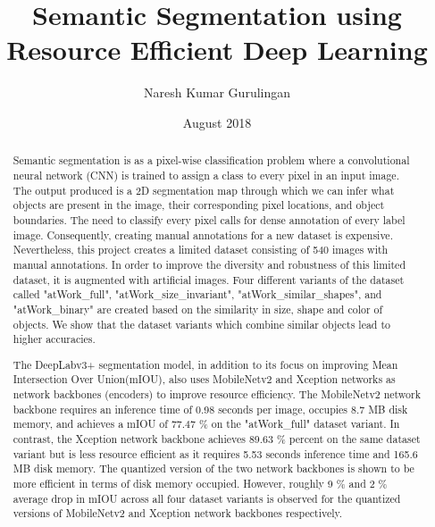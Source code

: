 \documentclass[rnd]{mas_report}
\author{Naresh Kumar Gurulingan}
\title{Semantic Segmentation using Resource Efficient Deep Learning}
\date{August 2018}
\begin{document}
\begin{titlepage}
    \maketitle
\end{titlepage}


\pagestyle{plain}


\cleardoublepage
\statementpage

\begin{abstract}
Semantic segmentation is as a pixel-wise classification problem where a convolutional neural network (CNN) is trained to assign a class to every pixel in an input image. The output produced is a 2D segmentation map through which we can infer what objects are present in the image, their corresponding pixel locations, and object boundaries. The need to classify every pixel calls for dense annotation of every label image. Consequently, creating manual annotations for a new dataset is expensive. Nevertheless, this project creates a limited dataset consisting of 540 images with manual annotations. In order to improve the diversity and robustness of this limited dataset, it is augmented with artificial images. Four different variants of the dataset called "atWork\_full", "atWork\_size\_invariant", "atWork\_similar\_shapes", and "atWork\_binary" are created based on the similarity in size, shape and color of objects. We show that the dataset variants which combine similar objects lead to higher accuracies. 

The DeepLabv3+ segmentation model, in addition to its focus on improving Mean Intersection Over Union(mIOU), also uses MobileNetv2 and Xception networks as network backbones (encoders) to improve resource efficiency. The MobileNetv2 network backbone requires an inference time of 0.98 seconds per image, occupies 8.7 MB disk memory, and achieves a mIOU of 77.47 \% on the "atWork\_full" dataset variant. In contrast, the Xception network backbone achieves 89.63 \% percent on the same dataset variant but is less resource efficient as it requires 5.53 seconds inference time and 165.6 MB disk memory. The quantized version of the two network backbones is shown to be more efficient in terms of disk memory occupied. However, roughly 9 \% and 2 \% average drop in mIOU across all four dataset variants is observed for the quantized versions of MobileNetv2 and Xception network backbones respectively.
\end{abstract}
\end{document}
